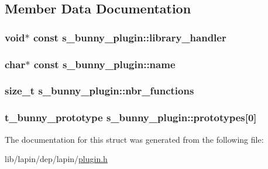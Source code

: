 \subsection{Member Data Documentation}
\hypertarget{structs__bunny__plugin_acdb9c7f468241e8ae0b5b3ae9fc38ca0}{
\subsubsection[{library\-\_\-handler}]{ void$\ast$ {\bf const} s\-\_\-bunny\-\_\-plugin\-::library\-\_\-handler}}\label{structs__bunny__plugin_acdb9c7f468241e8ae0b5b3ae9fc38ca0}
\hypertarget{structs__bunny__plugin_ae5f992eeb22aefab2ed1a5d3b81b646a}{
\subsubsection[{name}]{ char$\ast$ {\bf const} s\-\_\-bunny\-\_\-plugin\-::name}}\label{structs__bunny__plugin_ae5f992eeb22aefab2ed1a5d3b81b646a}
\hypertarget{structs__bunny__plugin_ab180c473724f136b8d177c758ea8e9c7}{
\subsubsection[{nbr\-\_\-functions}]{ {\bf size\-\_\-t} s\-\_\-bunny\-\_\-plugin\-::nbr\-\_\-functions}}\label{structs__bunny__plugin_ab180c473724f136b8d177c758ea8e9c7}
\hypertarget{structs__bunny__plugin_a3e1d1c9c7e24b3b379c274dc775bf4f8}{
\subsubsection[{prototypes}]{ {\bf t\-\_\-bunny\-\_\-prototype} s\-\_\-bunny\-\_\-plugin\-::prototypes\mbox{[}0\mbox{]}}}\label{structs__bunny__plugin_a3e1d1c9c7e24b3b379c274dc775bf4f8}


The documentation for this struct was generated from the following file\-:\begin{DoxyCompactItemize}
\item 
lib/lapin/dep/lapin/\hyperlink{plugin_8h}{plugin.\-h}\end{DoxyCompactItemize}

